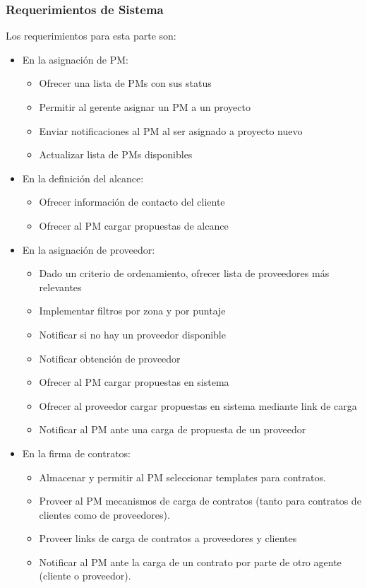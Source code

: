 \subsubsection{Requerimientos de Sistema}
Los requerimientos para esta parte son:
\begin{itemize}
	\item En la asignación de PM:
	\begin{itemize}
		\item Ofrecer una lista de PMs con sus status
		\item Permitir al gerente asignar un PM a un proyecto %
		\item Enviar notificaciones al PM al ser asignado a proyecto nuevo
		\item Actualizar lista de PMs disponibles
	\end{itemize}
	\item En la definición del alcance:
	\begin{itemize}
		\item Ofrecer información de contacto del cliente
		\item Ofrecer al PM cargar propuestas de alcance
	\end{itemize}
	\item En la asignación de proveedor:
	\begin{itemize}
		\item Dado un criterio de ordenamiento, ofrecer lista de proveedores más relevantes
		\item Implementar filtros por zona y por puntaje
		\item Notificar si no hay un proveedor disponible
		\item Notificar obtención de proveedor %
		\item Ofrecer al PM cargar propuestas en sistema
		\item Ofrecer al proveedor cargar propuestas en sistema mediante link de carga
		\item Notificar al PM ante una carga de propuesta de un proveedor
	\end{itemize}
	\item En la firma de contratos:
	\begin{itemize}
		\item Almacenar y permitir al PM seleccionar templates para contratos.
		\item Proveer al PM mecanismos de carga de contratos (tanto para contratos de clientes como de proveedores).
		\item Proveer links de carga de contratos a proveedores y clientes
		\item Notificar al PM ante la carga de un contrato por parte de otro agente (cliente o proveedor). %
	\end{itemize}
\end{itemize}


